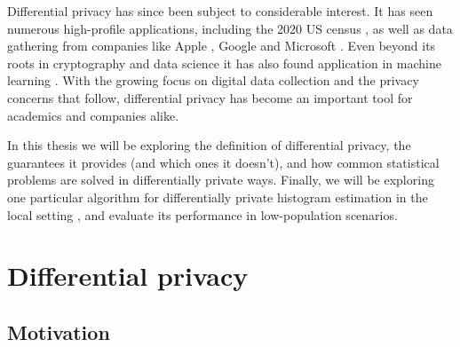 \documentclass[12pt]{article}
\begin{document}
Differential privacy has since been subject to considerable interest. It has seen numerous high-profile applications, including the 2020 US census \cite{us_census}, as well as data gathering from companies like Apple \cite{apple_differential,apple_differential_loss}, Google \cite{google_rappor,google_prochlo} and Microsoft \cite{dworketal2006,microsoft_telemetry}. Even beyond its roots in cryptography and data science it has also found application in machine learning \cite{ml_abadi,ml_shokri,ml_papernot}. With the growing focus on digital data collection and the privacy concerns that follow, differential privacy has become an important tool for academics and companies alike.

\bigskip

In this thesis we will be exploring the definition of differential privacy, the guarantees it provides (and which ones it doesn't), and how common statistical problems are solved in differentially private ways. Finally, we will be exploring one particular algorithm for differentially private histogram estimation in the local setting \cite{microsoft_telemetry}, and evaluate its performance in low-population scenarios.

\section{Differential privacy \label{sec:diffpriv}}

\subsection{Motivation}
\end{document}
